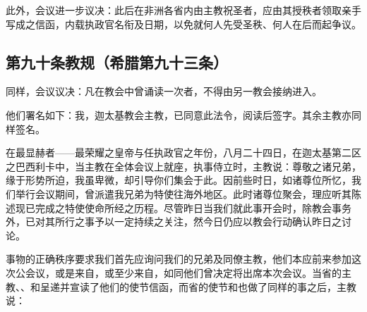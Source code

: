 \par

此外，会议进一步议决：此后在非洲各省内由主教祝圣者，应由其授秩者领取亲手写成之信函，内载执政官名衔及日期，以免就何人先受圣秩、何人在后而起争议。\par


\subsection{第九十条教规（希腊第九十三条）}

\par

同样，会议议决：凡在教会中曾诵读一次者，不得由另一教会接纳进入。\par

他们署名如下：我，迦太基教会主教，已同意此法令，阅读后签字。其余主教亦同样签名。\par

\par

在最显赫者——最荣耀之皇帝与任执政官之年份，八月二十四日，在迦太基第二区之巴西利卡中，当主教在全体会议上就座，执事侍立时，主教说：尊敬之诸兄弟，缘于形势所迫，我虽卑微，却引导你们集会于此。因前些时日，如诸尊位所忆，我们举行会议期间，曾派遣我兄弟为特使往海外地区。此时诸尊位聚会，理应听其陈述现已完成之特使使命所经之历程。尽管昨日当我们就此事开会时，除教会事务外，已对其所行之事予以一定持续之关注，然今日仍应以教会行动确认昨日之讨论。\par

\par

事物的正确秩序要求我们首先应询问我们的兄弟及同僚主教，他们本应前来参加这次公会议，或是来自，或至少来自，如同他们曾决定将出席本次会议。当省的主教、、和呈递并宣读了他们的使节信函，而省的使节和也做了同样的事之后，主教说：\par

